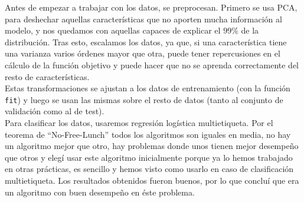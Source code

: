 \documentclass{article}
\begin{document}
Antes de empezar a trabajar con los datos, se preprocesan. Primero se usa PCA, para deshechar aquellas características que no aporten mucha información al modelo, y nos quedamos con aquellas capaces de explicar el $99\%$ de la distribución. Tras esto, escalamos los datos, ya que, si una característica tiene una varianza varios órdenes mayor que otra, puede tener repercusiones en el cálculo de la función objetivo y puede hacer que no se aprenda correctamente del resto de características.\\
Estas transformaciones se ajustan a los datos de entrenamiento (con la función \texttt{fit}) y luego se usan las mismas sobre el resto de datos (tanto al conjunto de validación como al de test).\\

Para clasificar los datos, usaremos regresión logística multietiqueta. Por el teorema de ``No-Free-Lunch'' todos los algoritmos son iguales en media, no hay un algoritmo mejor que otro, hay problemas donde unos tienen mejor desempeño que otros y elegí usar este algoritmo inicialmente porque ya lo hemos trabajado en otras prácticas, es sencillo y hemos visto como usarlo en caso de clasificación multietiqueta. Los resultados obtenidos fueron buenos, por lo que concluí que era un algoritmo con buen desempeño en éste problema.\\
\end{document}

